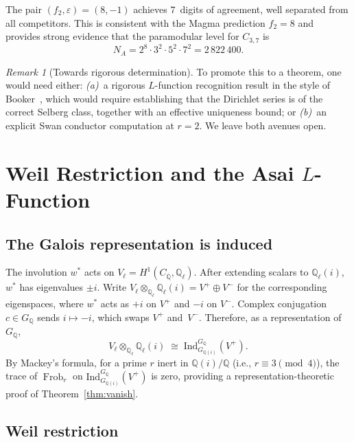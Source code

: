 \documentclass[11pt,a4paper]{article}
\newcommand{\Frob}{\operatorname{Frob}}
\newcommand{\Qbar}{\overline{\mathbb{Q}}}
\newcommand{\Ql}{\mathbb{Q}_\ell}
\theoremstyle{definition}
\theoremstyle{remark}
\newtheorem{remark}[theorem]{Remark}
\begin{document}
The pair $(f_2, \varepsilon) = (8, -1)$ achieves $7$~digits of
agreement, well separated from all competitors.
This is consistent with the Magma prediction $f_2 = 8$ and provides
strong evidence that the paramodular level for $C_{3,7}$ is
\begin{equation}\label{eq:level37}
  N_A = 2^8 \cdot 3^2 \cdot 5^2 \cdot 7^2 = 2\,822\,400.
\end{equation}

\begin{remark}[Towards rigorous determination]
  To promote this to a theorem, one would need either:
  \emph{(a)}~a rigorous $L$-function recognition result in the
  style of Booker~\cite{Booker}, which would require establishing
  that the Dirichlet series is of the correct Selberg class,
  together with an effective uniqueness bound; or
  \emph{(b)}~an explicit Swan conductor computation at $r = 2$.
  We leave both avenues open.
\end{remark}


\section{Weil Restriction and the Asai $L$-Function}
\label{sec:weil}

\subsection{The Galois representation is induced}

The involution $w^*$ acts on $V_\ell = H^1(C_{\Qbar}, \Ql)$.
After extending scalars to $\Ql(i)$, $w^*$ has eigenvalues $\pm i$.
Write $V_\ell \otimes_{\Ql} \Ql(i) = V^+ \oplus V^-$
for the corresponding eigenspaces, where $w^*$ acts as $+i$
on $V^+$ and $-i$ on $V^-$.
Complex conjugation $c \in G_{\mathbb{Q}}$ sends $i \mapsto -i$,
which swaps $V^+$ and~$V^-$.
Therefore, as a representation of $G_{\mathbb{Q}}$,
\begin{equation}\label{eq:induced}
  V_\ell \otimes_{\Ql} \Ql(i) \;\cong\;
  \mathrm{Ind}_{G_{\mathbb{Q}(i)}}^{G_{\mathbb{Q}}}(V^+).
\end{equation}
By Mackey's formula, for a prime $r$ inert in $\mathbb{Q}(i)/\mathbb{Q}$
(i.e., $r \equiv 3 \pmod 4$), the trace of $\Frob_r$ on
$\mathrm{Ind}_{G_{\mathbb{Q}(i)}}^{G_{\mathbb{Q}}}(V^+)$ is
zero, providing a representation-theoretic proof of Theorem~\ref{thm:vanish}.

\subsection{Weil restriction}\label{ssec:weilrestr}
\end{document}
